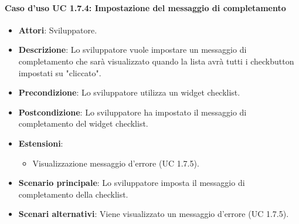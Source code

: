 \paragraph{Caso d'uso UC 1.7.4: Impostazione del messaggio di completamento}

\FloatBarrier
\begin{itemize}
\item\textbf{Attori}: Sviluppatore.
\item\textbf{Descrizione}: Lo sviluppatore vuole impostare un messaggio di completamento che sarà visualizzato quando la lista avrà tutti i checkbutton impostati su "cliccato".
\item\textbf{Precondizione}: Lo sviluppatore utilizza un widget checklist.
\item\textbf{Postcondizione}: Lo sviluppatore ha impostato il messaggio di completamento del widget checklist.
\item\textbf{Estensioni}: 
\begin{itemize}
\item Visualizzazione messaggio d'errore (UC 1.7.5).
\end{itemize}
\item\textbf{Scenario principale}: Lo sviluppatore imposta il messaggio di completamento della checklist.
\item\textbf{Scenari alternativi}: Viene visualizzato un messaggio d'errore (UC 1.7.5).
\end{itemize}
